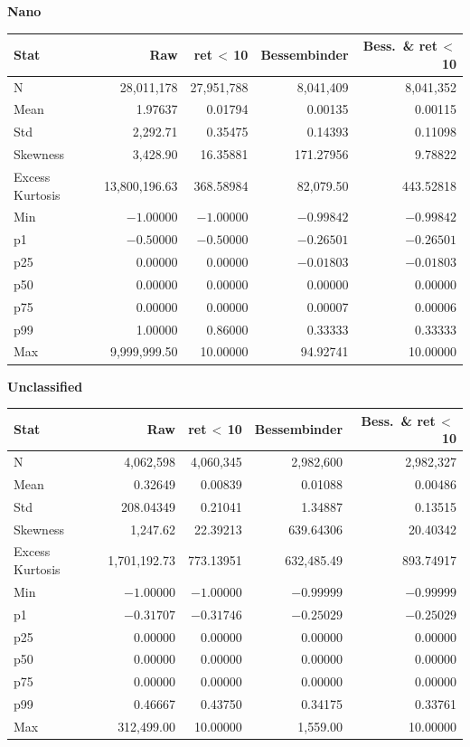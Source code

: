 \documentclass[10pt]{article}
\begin{document}
\begin{center}
\vspace{1.1em}
\textbf{Nano}\\[2pt]
\begin{tabular}{l r r r r}
\toprule
Stat & {Raw} & {ret\,$<$\,10} & {Bessembinder} & {Bess.\ \& ret\,$<$\,10} \\
\midrule
N & 28,011,178 & 27,951,788 & 8,041,409 & 8,041,352 \\
Mean & 1.97637 & 0.01794 & 0.00135 & 0.00115 \\
Std & 2,292.71 & 0.35475 & 0.14393 & 0.11098 \\
Skewness & 3,428.90 & 16.35881 & 171.27956 & 9.78822 \\
Excess Kurtosis & 13,800,196.63 & 368.58984 & 82,079.50 & 443.52818 \\
Min & $-1.00000$ & $-1.00000$ & $-0.99842$ & $-0.99842$ \\
p1 & $-0.50000$ & $-0.50000$ & $-0.26501$ & $-0.26501$ \\
p25 & 0.00000 & 0.00000 & $-0.01803$ & $-0.01803$ \\
p50 & 0.00000 & 0.00000 & 0.00000 & 0.00000 \\
p75 & 0.00000 & 0.00000 & 0.00007 & 0.00006 \\
p99 & 1.00000 & 0.86000 & 0.33333 & 0.33333 \\
Max & 9,999,999.50 & 10.00000 & 94.92741 & 10.00000 \\
\bottomrule
\end{tabular}

\vspace{1.1em}
\clearpage
\vspace{1.1em}
\textbf{Unclassified}\\[2pt]
\begin{tabular}{l r r r r}
\toprule
Stat & {Raw} & {ret\,$<$\,10} & {Bessembinder} & {Bess.\ \& ret\,$<$\,10} \\
\midrule
N & 4,062,598 & 4,060,345 & 2,982,600 & 2,982,327 \\
Mean & 0.32649 & 0.00839 & 0.01088 & 0.00486 \\
Std & 208.04349 & 0.21041 & 1.34887 & 0.13515 \\
Skewness & 1,247.62 & 22.39213 & 639.64306 & 20.40342 \\
Excess Kurtosis & 1,701,192.73 & 773.13951 & 632,485.49 & 893.74917 \\
Min & $-1.00000$ & $-1.00000$ & $-0.99999$ & $-0.99999$ \\
p1 & $-0.31707$ & $-0.31746$ & $-0.25029$ & $-0.25029$ \\
p25 & 0.00000 & 0.00000 & 0.00000 & 0.00000 \\
p50 & 0.00000 & 0.00000 & 0.00000 & 0.00000 \\
p75 & 0.00000 & 0.00000 & 0.00000 & 0.00000 \\
p99 & 0.46667 & 0.43750 & 0.34175 & 0.33761 \\
Max & 312,499.00 & 10.00000 & 1,559.00 & 10.00000 \\
\bottomrule
\end{tabular}

\end{center}
\end{document}
